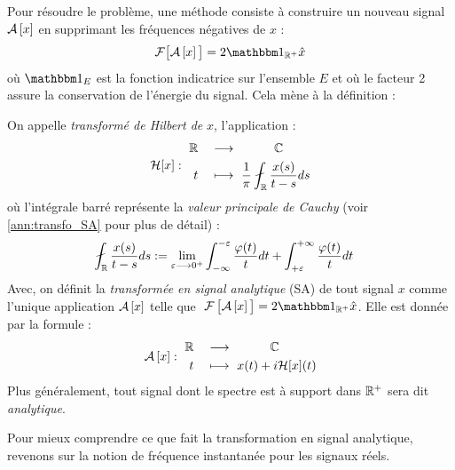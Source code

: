 \begin{annexe}
Pour résoudre le problème, une méthode consiste à construire un nouveau signal $\mathcal{A}\left[x\right]$ en supprimant les fréquences négatives de $x$ :
\[\mathcal{F}\big[\SA{x}\big] = 2\one_{\R^+}\fou{x}\]
où $\one_E$ est la fonction indicatrice sur l'ensemble $E$ et où le facteur 2 assure la conservation de l'énergie du signal. Cela mène à la définition :

\begin{definition}\label{def:transfo_sa&hilbert}
	On appelle \emph{transformé de Hilbert de} $x$, l'application :
	\begin{equation}\label{eq:transfo_Hilb}
		\mathcal{H}[x] :\ \begin{aligned} 
			\R \quad &\lr\qquad\quad \C \\	
			t\quad &\longmapsto\ \frac{1}{\pi}\fint_\R \frac{x(s)}{t-s}ds %
		\end{aligned}
	\end{equation}
	où l'intégrale barré représente la \emph{valeur principale de Cauchy} (voir \cref{ann:transfo_SA} pour plus de détail) :
	\begin{align*}
		\fint_\R \frac{x(s)}{t-s}ds &\defeq \lim_{\varepsilon\lr0^+} \int_{-\infty}^{-\varepsilon} \frac{\varphi(t)}{t}dt + \int_{+\varepsilon}^{+\infty} \frac{\varphi(t)}{t}dt 
	\end{align*}
	Avec, on définit la \emph{transformée en signal analytique} (SA) de tout signal $x$ comme l'unique application $\mathcal{A}\left[x\right]$ telle que $\ \Fou{\SA{x}\big.}= 2\one_{\R^+}\fou{x}$. Elle est donnée par la formule :
	\begin{equation}\label{eq:transfo_SA}
		\SA{x} :\ \begin{aligned} 
			\R \quad &\lr\qquad\quad \C \\	
			t\quad &\longmapsto\ x(t) + i\mathcal{H}[x](t) %
		\end{aligned}
	\end{equation}
	Plus généralement, tout signal dont le spectre est à support dans $\mathbb{R}^+$ sera dit \emph{analytique}.
\end{definition}
\skipl

Pour mieux comprendre ce que fait la transformation en signal analytique, revenons sur la notion de fréquence instantanée pour les signaux réels.
\\




\end{annexe}
